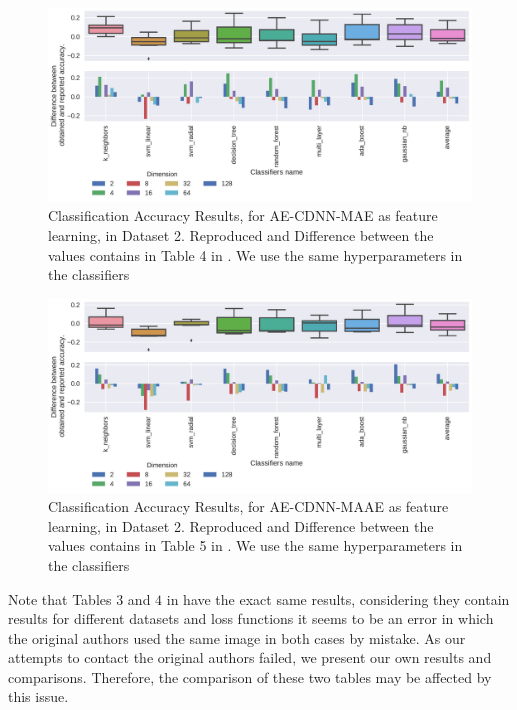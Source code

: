 



\begin{figure}[!ht]
  \centering
  \includegraphics[width=\linewidth]{figure/table_4.pdf}
  \caption{Classification Accuracy Results, for AE-CDNN-MAE as feature learning, in Dataset 2. Reproduced and Difference between the values contains in Table 4 in \cite{WenZha:2018}. We use the same hyperparameters in the classifiers}
\label{fig:acc-AE-CDNN-MAE-d2}
\end{figure}

\begin{figure}[!ht]
  \centering
  \includegraphics[width=\linewidth]{figure/table_5.pdf}
  \caption{Classification Accuracy Results, for AE-CDNN-MAAE as feature learning, in Dataset 2. Reproduced and Difference between the values contains in Table 5 in \cite{WenZha:2018}. We use the same hyperparameters in the classifiers}
\label{fig:acc-AE-CDNN-MAAE-d2}
\end{figure}

Note that Tables $3$ and $4$ in \cite{WenZha:2018} have the exact same results, considering they contain results for different datasets and loss functions it seems to be an error in which the original authors used the same image in both cases by mistake. As our attempts to contact the original authors failed, we present our own results and comparisons. Therefore, the comparison of these two tables may be affected by this issue.


